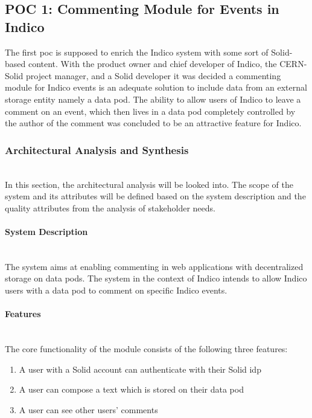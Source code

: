 \subsection{POC 1: Commenting Module for Events in Indico}

The first \gls{poc} is supposed to enrich the Indico system with some sort of Solid-based content. With the product owner and chief developer of Indico, the CERN-Solid project manager, and a Solid developer it was decided a commenting module for Indico events is an adequate solution to include data from an external storage entity namely a data pod. The ability to allow users of Indico to leave a comment on an event, which then lives in a data pod completely controlled by the author of the comment was concluded to be an attractive feature for Indico.

\subsubsection{Architectural Analysis and Synthesis}\mbox{}\\

In this section, the architectural analysis will be looked into. The scope of the system and its attributes will be defined based on the system description and the quality attributes from the analysis of stakeholder needs.

\paragraph{System Description}\mbox{}\\

The system aims at enabling commenting in web applications with decentralized storage on data pods. The system in the context of Indico intends to allow Indico users with a data pod to comment on specific Indico events.

\paragraph{Features}\mbox{}\\

The core functionality of the module consists of the following three features: 

\vspace{-12mm}
\begin{enumerate}
    \item A user with a Solid account can authenticate with their Solid \gls{idp}
    \item A user can compose a text which is stored on their data pod
    \item A user can see other users’ comments
\end{enumerate}
\vspace{-10mm}

